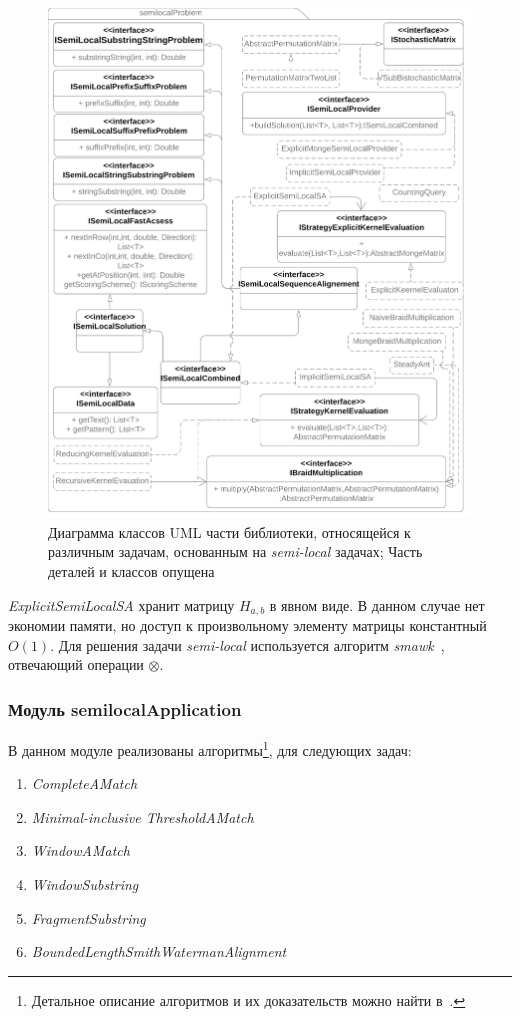 \begin{figure}
  \centering
  \includegraphics[height=0.72\columnwidth,angle=90]{Mishin/figures/Library.png}
  \caption{Диаграмма классов UML части библиотеки, относящейся к различным задачам, основанным на  \emph{semi-local} задачах; Часть деталей и классов опущена}\label{fig:libraryProblem}
\end{figure}

\emph{ExplicitSemiLocalSA} хранит матрицу $H_{a,b}$ в явном виде.
В данном случае нет экономии памяти, но доступ к произвольному элементу матрицы константный $O(1)$. 
Для решения задачи \emph{semi-local} используется алгоритм \emph{smawk}~\cite{aggarwal1987geometric}, отвечающий операции  $\otimes$.








\subsubsection{Модуль semilocalApplication}
В данном модуле реализованы алгоритмы\footnote{Детальное описание алгоритмов и их доказательств можно найти в~\cite{tiskin2006all}.}, для следующих задач:
\begin{enumerate}
    \item \emph{CompleteAMatch}
    \item \emph{Minimal-inclusive ThresholdAMatch}
    \item \emph{WindowAMatch}
    \item \emph{WindowSubstring}
    \item \emph{FragmentSubstring}
    \item \emph{BoundedLengthSmithWatermanAlignment}
\end{enumerate}

